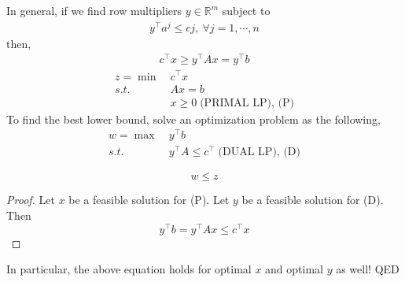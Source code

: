 \documentclass[11pt]{article}
\numberwithin{equation}{section}
\begin{document}
In general, if we find row multipliers $y \in \mathbb{R}^m$ subject to \begin{align*}
    y^\top a^j \leq cj, \ \forall j = 1, \cdots, n
\end{align*}
then, \begin{align*}
    c^{\top} x \geqslant y^{\top} A x=y^{\top}b
\end{align*}
\begin{align*}
    z=\min&\ c^\top x \\
    s.t.& \ Ax=b\\
    &\ x \geq 0\; \text{(PRIMAL LP), (P)}
\end{align*}
To find the best lower bound, solve an optimization problem as the following,
\begin{align*}
    w=\max&\ y^\top b \\
    s.t. & \ y^\top A\leq c^\top  \;
    \text{(DUAL LP), (D)}
\end{align*}
\begin{theorem}
    $$w\leq z$$
    \begin{proof}
        Let $x$ be a feasible solution for (P). Let $y$ be a feasible solution for (D). Then 
        $$y^{\top} b=y^{\top} A x \leqslant c^{\top} x$$
    \end{proof}
    In particular, the above equation holds for optimal $x$ and optimal $y$ as well! QED
\end{theorem}
\end{document}
